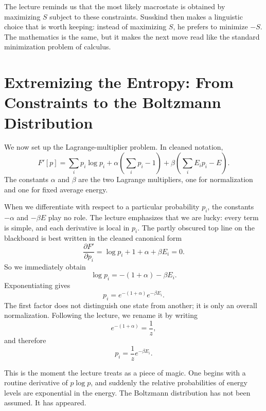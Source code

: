 The lecture reminds us that the most likely macrostate is obtained by maximizing \(S\) subject to these constraints. Susskind then makes a linguistic choice that is worth keeping: instead of maximizing \(S\), he prefers to minimize \(-S\). The mathematics is the same, but it makes the next move read like the standard minimization problem of calculus.

\section{Extremizing the Entropy: From Constraints to the Boltzmann Distribution}

We now set up the Lagrange-multiplier problem. In cleaned notation,
\begin{equation}
F'[p]
=
\sum_i p_i \log p_i
+
\alpha\left(\sum_i p_i-1\right)
+
\beta\left(\sum_i E_i p_i-E\right).
\end{equation}
The constants \(\alpha\) and \(\beta\) are the two Lagrange multipliers, one for normalization and one for fixed average energy.

When we differentiate with respect to a particular probability \(p_i\), the constants \(-\alpha\) and \(-\beta E\) play no role. The lecture emphasizes that we are lucky: every term is simple, and each derivative is local in \(p_i\). The partly obscured top line on the blackboard is best written in the cleaned canonical form
\begin{equation}
\frac{\partial F'}{\partial p_i}
=
\log p_i + 1 + \alpha + \beta E_i
=
0.
\end{equation}
So we immediately obtain
\begin{equation}
\log p_i = -(1+\alpha)-\beta E_i.
\end{equation}
Exponentiating gives
\begin{equation}
p_i = e^{-(1+\alpha)} e^{-\beta E_i}.
\end{equation}
The first factor does not distinguish one state from another; it is only an overall normalization. Following the lecture, we rename it by writing
\begin{equation}
e^{-(1+\alpha)}=\frac{1}{z},
\end{equation}
and therefore
\begin{equation}
p_i=\frac{1}{z}e^{-\beta E_i}.
\end{equation}

This is the moment the lecture treats as a piece of magic. One begins with a routine derivative of \(p\log p\), and suddenly the relative probabilities of energy levels are exponential in the energy. The Boltzmann distribution has not been assumed. It has appeared.

